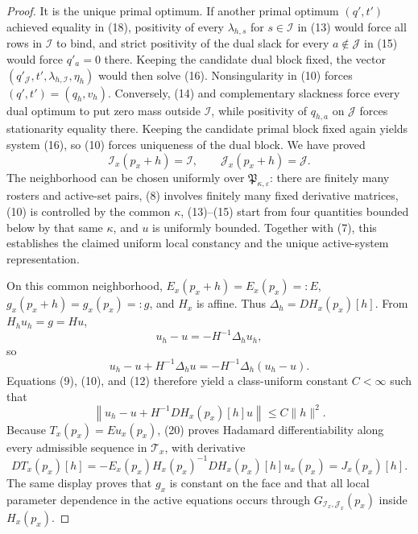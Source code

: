 \documentclass{article}
\begin{document}
\begin{proof}
It is the unique primal optimum.  If another primal optimum \((q',t')\) achieved equality in (18), positivity of every \(\lambda_{h,s}\) for \(s\in\mathcal I\) in (13) would force all rows in \(\mathcal I\) to bind, and strict positivity of the dual slack for every \(a\notin\mathcal J\) in (15) would force \(q'_a=0\) there.  Keeping the candidate dual block fixed, the vector \((q'_{\mathcal J},t',\lambda_{h,\mathcal I},\eta_h)\) would then solve (16).  Nonsingularity in (10) forces \((q',t')=(q_h,v_h)\).  Conversely, (14) and complementary slackness force every dual optimum to put zero mass outside \(\mathcal I\), while positivity of \(q_{h,a}\) on \(\mathcal J\) forces stationarity equality there.  Keeping the candidate primal block fixed again yields system (16), so (10) forces uniqueness of the dual block.  We have proved
\[
 \mathcal I_x(p_x+h)=\mathcal I,\qquad
 \mathcal J_x(p_x+h)=\mathcal J.
 \tag{19}
\]
The neighborhood can be chosen uniformly over \(\mathfrak P_{\kappa,\varepsilon}\): there are finitely many rosters and active-set pairs, (8) involves finitely many fixed derivative matrices, (10) is controlled by the common \(\kappa\), (13)--(15) start from four quantities bounded below by that same \(\kappa\), and \(u\) is uniformly bounded.  Together with (7), this establishes the claimed uniform local constancy and the unique active-system representation.

On this common neighborhood, \(E_x(p_x+h)=E_x(p_x)=:E\), \(g_x(p_x+h)=g_x(p_x)=:g\), and \(H_x\) is affine.  Thus \(\Delta_h=DH_x(p_x)[h]\).  From \(H_hu_h=g=Hu\),
\[
 u_h-u=-H^{-1}\Delta_hu_h,
\]
so
\[
 u_h-u+H^{-1}\Delta_hu
 =-H^{-1}\Delta_h(u_h-u).
\]
Equations (9), (10), and (12) therefore yield a class-uniform constant \(C<\infty\) such that
\[
 \left\|u_h-u+H^{-1}DH_x(p_x)[h]u\right\|
 \leq C\|h\|^2.
 \tag{20}
\]
Because \(T_x(p_x)=Eu_x(p_x)\), (20) proves Hadamard differentiability along every admissible sequence in \(\mathcal T_x\), with derivative
\[
 DT_x(p_x)[h]
 =-E_x(p_x)H_x(p_x)^{-1}DH_x(p_x)[h]u_x(p_x)
 =J_x(p_x)[h].
 \tag{21}
\]
The same display proves that \(g_x\) is constant on the face and that all local parameter dependence in the active equations occurs through \(G_{\mathcal I_x,\mathcal J_x}(p_x)\) inside \(H_x(p_x)\).


\end{proof}
\end{document}
